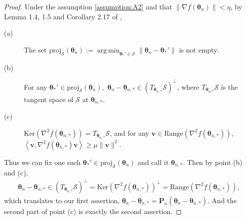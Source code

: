 \documentclass[11pt]{amsart}
\theoremstyle{plain}
\theoremstyle{definition}
\theoremstyle{remark}
\def\bP{\mathbf{P}}
\def\param{\boldsymbol{\theta}}
\DeclareMathOperator*{\argmin}{arg\,min}
\newcommand{\innp}[1]{\left\langle #1 \right\rangle}
\begin{document}
\begin{proof}
    Under the assumption \ref{assumption:A2} and that $\|\nabla f(\param_n)\|<\eta$, by Lemma 1.4, 1.5 and Corollary 2.17 of \cite{rebjock2024fast},
    \begin{description}
        \item[(a)]
             The set $\text{proj}_{\mathcal{S}}(\param_n):=\argmin_{\param_*'\in \mathcal{S}}\|\param_{n}-\param_{*}'\|$ is not empty.
        \item[(b)]
            For any $\param_*'\in \text{proj}_{\mathcal{S}}(\param_n),$ $\param_n-\param_{n,*}\in (T_{\param_{n,*}}\mathcal{S})^{\perp}$, where $T_{\param_{n,*}}\mathcal{S}$ is the tangent space of $\mathcal{S}$ at $\param_{n,*}$.
        \item[(c)]
            $\text{Ker}(\nabla^2f(\param_{n,*}))=T_{\param_{n,*}}\mathcal{S}$, and for any $\mathbf{v}\in \text{Range}(\nabla^2f(\param_{n,*})),$ $ \innp{\mathbf{v},\nabla^2f(\param_{n,*})\mathbf{v}}\geq \mu\|\mathbf{v}\|^2.$
    \end{description}
   Thus we can fix one such $\param_*'\in \text{proj}_{\mathcal{S}}(\param_n)$ and call it $\param_{n,*}.$ Then by point (b) and (c),
   \begin{align*}
       \param_n-\param_{n,*}\in (T_{\param_{n,*}}\mathcal{S})^{\perp}=\text{Ker}(\nabla^2f(\param_{n,*}))^{\perp}=\text{Range}(\nabla^2f(\param_{n,*})),
   \end{align*}
   which translates to our first assertion, $\param_n-\param_{n,*}=\bP_n(\param_n-\param_{n,*}).$ And the second part of point (c) is exactly the second assertion.
\end{proof}



\end{document}
